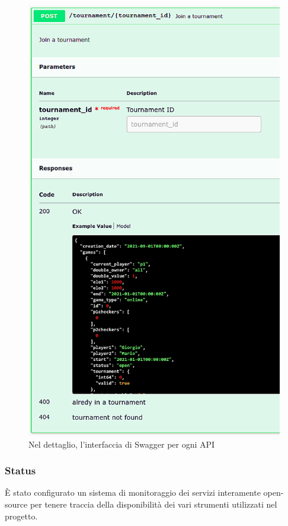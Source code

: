\documentclass{article}
\begin{document}
\begin{figure}[H]
\begin{minipage}[t]{0.49\textwidth}
        \includegraphics[width=\textwidth]{report-sw_joinTournament}
        \caption{Nel dettaglio, l'interfaccia di Swagger per ogni API}
        \label{fig:sw_joinTournament}
    \end{minipage}    
\end{figure}

\newpage

\subsubsection{Status}
\label{sec:status}
È stato configurato un sistema di monitoraggio dei servizi interamente open-source per tenere traccia della disponibilità 
dei vari strumenti utilizzati nel progetto.
\end{document}
